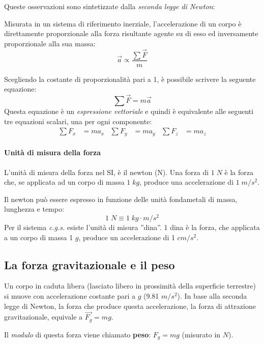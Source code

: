 \documentclass[a4paper,11pt,oneside]{book}
\begin{document}
Queste osservazioni sono sintetizzate dalla \emph{seconda legge di Newton}:
\begin{displayquote}
    \centering
    Misurata in un sistema di riferimento inerziale, l’accelerazione di un corpo è direttamente
    proporzionale alla forza risultante agente su di esso ed inversamente proporzionale alla sua massa:
    \begin{equation*}
        \vec{a} \propto \frac{\sum\vec{F}}{m}
    \end{equation*}
\end{displayquote}
Scegliendo la costante di proporzionalità pari a 1, è possibile scrivere la seguente equazione:
\begin{equation*}
    \sum\vec{F} = m\vec{a}
\end{equation*}
Questa equazione è un \emph{espressione vettoriale} e quindi è equivalente alle seguenti tre equazioni scalari, una per ogni componente:
\begin{align*}
    \sum F_x & = ma_x & \sum F_y & = ma_y & \sum F_z & = ma_z
\end{align*}

\paragraph{Unità di misura della forza}
L’unità di misura della forza nel SI, è il newton (N).
Una forza di $1 \; N$ è la forza che, se applicata ad un corpo di massa $1 \; kg$, produce una accelerazione di $1 \; m/s^2$.

Il newton può essere espresso in funzione delle unità fondametali di massa, lunghezza e tempo:
\begin{equation*}
    1 \; N \equiv 1 \; kg \cdot m/s^2
\end{equation*}
Per il sistema \emph{c.g.s.} esiste l'unità di misura ''dina''. 1 dina è la forza, che applicata a un corpo di massa 1 $g$, produce un accelerazione di 1 $cm/s^2$.

\subsection{La forza gravitazionale e il peso}
Un corpo in caduta libera (lasciato libero in prossimità della superficie terrestre) si muove con accelerazione costante pari a $g$ (9.81 $m/s^2$).
In base alla seconda legge di Newton, la forza che produce questa accelerazione, la forza di attrazione gravitazionale, equivale a $\vec{F_g} = mg$.

Il \emph{modulo} di questa forza viene chiamato \textbf{peso}: $F_g = mg$ (misurato in $N$).
\end{document}
